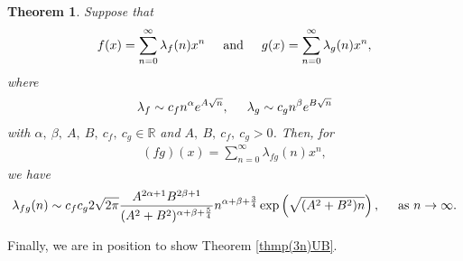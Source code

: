 \documentclass[12pt,a4paper]{amsart}
\numberwithin{equation}{section}
\theoremstyle{plain}
\newtheorem{thm}{Theorem}[section]
\theoremstyle{definition}
\theoremstyle{remark}
\begin{document}
\begin{thm}\label{thm: Murty}
    Suppose that
    \begin{align*}
        f(x)=\sum_{n=0}^\infty\lambda_f(n)x^n\hspace{0.5cm}\text{and}\hspace{0.5cm}g(x)=\sum_{n=0}^\infty\lambda_g(n)x^n,
    \end{align*}
    where
    \begin{align*}
        \lambda_f\sim c_fn^\alpha e^{A\sqrt{n}},\hspace{0.5cm} \lambda_g\sim c_gn^\beta e^{B\sqrt{n}}
    \end{align*}
    with $\alpha,\ \beta,\ A,\ B,\ c_f,\ c_g\in\mathbb{R}$ and $A,\ B,\ c_f,\ c_g>0$. Then, for
    \begin{align*}
        (fg)(x)=\sum_{n=0}^\infty\lambda_{fg}(n)x^n,
    \end{align*}
    we have 
    \begin{align*}
        \lambda_{fg}(n)\sim c_fc_g2\sqrt{2\pi}\frac{A^{2\alpha+1}B^{2\beta+1}}{(A^2+B^2)^{\alpha+\beta+\frac{5}{4}}}n^{\alpha+\beta+\frac{3}{4}}\exp\left(\sqrt{(A^2+B^2)n}\right),\hspace{0.5cm}\text{as }n\to\infty.
    \end{align*}
\end{thm}

Finally, we are in position to show Theorem \ref{thmp(3n)UB}.
\end{document}
